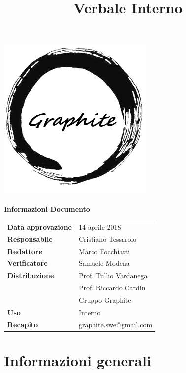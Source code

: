 \documentclass[openany,12pt,a4paper]{article}
\title{Verbale Interno}
\author{}
\begin{document}
 
  \makeatletter 
  \begin{titlepage} 
    \setlength{\headsep}{0pt}   
    \begin{center} 
      \includegraphics[width=0.5\linewidth]{Logo.png}\\[1em] 
      {\huge \bfseries  \@title }\\[10ex] 
      \textbf{\Large Informazioni Documento} \\[2em] 
      \bgroup 
      \def\arraystretch{1.5} 
      \begin{tabular}{l|l} 
        \textbf{Data approvazione} & 14 aprile 2018 \\ 
        \textbf{Responsabile} & Cristiano Tessarolo \\ 
        \textbf{Redattore} & Marco Focchiatti \\ 
        \textbf{Verificatore} & Samuele Modena \\ 
        \textbf{Distribuzione} & Prof. Tullio Vardanega \\ 
         & Prof. Riccardo Cardin \\ 
         & Gruppo Graphite \\ 
        \textbf{Uso} & Interno \\ 
        \textbf{Recapito} & graphite.swe@gmail.com \\ 
      \end{tabular} 
    \egroup 
    \end{center} 
  \end{titlepage} 
  \makeatother 
 
  \thispagestyle{empty} 
  \newpage 
   
  \tableofcontents 
  \newpage 
   
  \section{Informazioni generali} 
   
\end{document}
